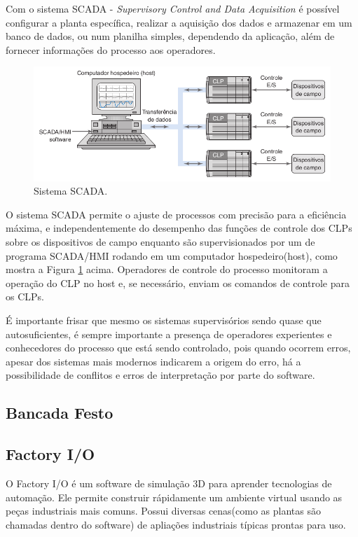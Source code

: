 \documentclass[a4paper, 12pt]{article}
\begin{document}
		Com o sistema SCADA - \textit{Supervisory Control and Data Acquisition} é possível
		configurar a planta específica, realizar a aquisição dos dados e armazenar em um
		banco de dados, ou num planilha simples, dependendo da aplicação, além de fornecer
		informações do processo aos operadores.
		
		\begin{figure}[H]
			\centering
			\includegraphics[scale=0.5]{figures/SCADA.png}
			\caption{Sistema SCADA.}
			\label{fig:scada}
		\end{figure}
		
		O sistema SCADA permite o ajuste de processos com precisão para a eficiência máxima, e
		independentemente do desempenho das funções de controle dos CLPs sobre os dispositivos
		de campo enquanto são supervisionados por um de programa SCADA/HMI rodando em um computador
		hospedeiro(host), como mostra a Figura \ref{fig:scada} acima. Operadores de controle do processo monitoram
		a operação do CLP no host e, se necessário, enviam os comandos de controle para os CLPs.
		
		É importante frisar que mesmo os sistemas supervisórios sendo quase que autosuficientes, é sempre
		importante a presença de operadores experientes e conhecedores do processo que está sendo controlado,
		pois quando ocorrem erros, apesar dos sistemas mais modernos indicarem a origem do erro, 
		há a possibilidade de conflitos e erros de interpretação por parte do software.

	\subsection{Bancada Festo}
	
	\subsection{Factory I/O}
	
		O Factory I/O é um software de simulação 3D para aprender tecnologias de automação.
		Ele permite construir rápidamente um ambiente virtual usando as peças industriais
		mais comuns. Possui diversas cenas(como as plantas são chamadas dentro do software)
		de apliações industriais típicas prontas para uso.
		
\end{document}
